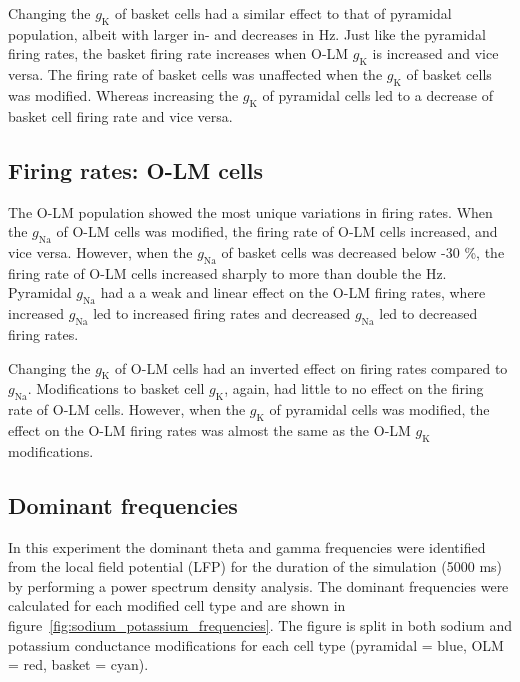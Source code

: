 Changing the \(g_{\text{K}}\) of basket cells had a similar effect to that of pyramidal population, albeit with larger in- and decreases in Hz.
Just like the pyramidal firing rates, the basket firing rate increases when O-LM \(g_{\text{K}}\) is increased and vice versa.
The firing rate of basket cells was unaffected when the \(g_{\text{K}}\) of basket cells was modified.
Whereas increasing the \(g_{\text{K}}\) of pyramidal cells led to a decrease of basket cell firing rate and vice versa.

\subsection{Firing rates: O-LM cells}
The O-LM population showed the most unique variations in firing rates.
When the \(g_{\text{Na}}\) of O-LM cells was modified, the firing rate of O-LM cells increased, and vice versa.
However, when the \(g_{\text{Na}}\) of basket cells was decreased below -30 \%, the firing rate of O-LM cells increased sharply to more than double the Hz.
Pyramidal \(g_{\text{Na}}\) had a a weak and linear effect on the O-LM firing rates, where increased \(g_{\text{Na}}\) led to increased firing rates and decreased \(g_{\text{Na}}\) led to decreased firing rates.

Changing the \(g_{\text{K}}\) of O-LM cells had an inverted effect on firing rates compared to \(g_{\text{Na}}\).
Modifications to basket cell \(g_{\text{K}}\), again, had little to no effect on the firing rate of O-LM cells.
However, when the \(g_{\text{K}}\) of pyramidal cells was modified, the effect on the O-LM firing rates was almost the same as the O-LM \(g_{\text{K}}\) modifications.
\pagebreak

\subsection{Dominant frequencies}
In this experiment the dominant theta and gamma frequencies were identified from the local field potential (LFP) for the duration of the simulation (5000 ms) by performing a power spectrum density analysis.
The dominant frequencies were calculated for each modified cell type and are shown in figure~\ref{fig:sodium_potassium_frequencies}.
The figure is split in both sodium and potassium conductance modifications for each cell type (pyramidal = blue, OLM = red, basket = cyan).

